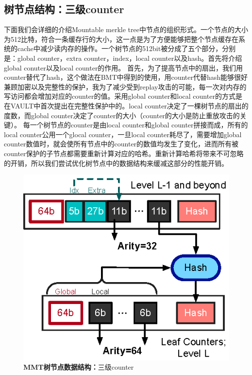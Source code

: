 \subsection{树节点结构：三级counter}
下面我们会详细的介绍Mountable merkle tree中节点的组织形式。一个节点的大小为512比特，符合一条缓存行的大小，这一点是为了方便能够把整个节点缓存在系统的cache中减少读内存的操作。一个树节点的512bit被分成了五个部分，分别是：global counter，extra counter，index，local counter以及hash。首先将介绍global conuter以及local counter的作用。
首先，为了提高节点中的扇出，我们用counter替代了hash，这个做法在BMT中得到的使用，用counter代替hash能够很好兼顾加密以及完整性的保护，我为了减少受到replay攻击的可能，每一次对内存的写访问都会增加对应的counter的值。采用global counter和local counter的方式是在VAULT中首次提出在完整性保护中的。local counter决定了一棵树节点的扇出的度数，而global counter决定了counter的大小（counter的大小是防止重放攻击的关键）。
每一个树节点的counter是由local counter和global counter拼接而成，所有的local counter公用一个glocal counter，一旦local counter耗尽了，需要增加global counter数值时，就会使所有节点中的counter的数值均发生了变化，进而所有被counter保护的子节点都需要重新计算对应的哈希。重新计算哈希将带来不可忽略的开销，所以我们尝试优化树节点中的数据结构来缓减这部分的性能开销。

\begin{figure}[!htp]
  \centering
  \includegraphics[scale=1]{fig/design-hw-mountable-tree-layout.eps}
  \caption{\textbf{MMT树节点数据结构：}三级counter}
 \label{fig:three-level-count.png}
\end{figure}

